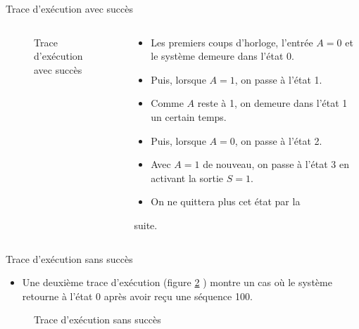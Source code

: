 \documentclass[presentation]{beamer}
\begin{document}
\begin{frame}[label={sec:org5cdca6d}]{Trace d'exécution avec succès}
\begin{columns}
\begin{column}{0.35\columnwidth}
\begin{block}{}
\begin{figure}[htbp]
\centering

\caption{\label{fig:org189b124}Trace d'exécution avec succès}
\end{figure}
\end{block}
\end{column}

\begin{column}{0.61\columnwidth}
\begin{block}{}
\begin{itemize}
\item Les premiers coups d'horloge, l'entrée \(A=0\) et le système demeure dans l'état 0.

\item Puis, lorsque \(A=1\), on passe à l'état 1.

\item Comme \(A\) reste à 1, on demeure dans l'état 1 un certain temps.

\item Puis, lorsque \(A=0\), on passe à l'état 2.

\item Avec \(A=1\) de nouveau, on passe à l'état 3 en activant la sortie \(S=1\).

\item On ne quittera plus cet état par la
\end{itemize}
suite.
\end{block}
\end{column}
\end{columns}
\end{frame}

\begin{frame}[label={sec:org982a463}]{Trace d'exécution sans succès}
\begin{itemize}
\item Une deuxième trace d'exécution (figure \ref{fig:org52adddc} ) montre un cas où le système retourne à l'état 0 après avoir reçu une séquence 100.
\end{itemize}

\begin{figure}[htbp]
\centering

\caption{\label{fig:org52adddc}Trace d'exécution sans succès}
\end{figure}
\end{frame}
\end{document}
